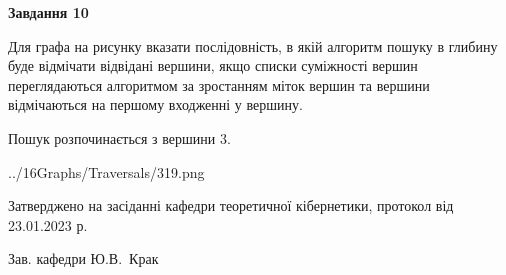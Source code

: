 \documentclass[12pt, ukrainian]{article}
\begin{document}
{\begin {large}
{\begin {center}\textbf{Завдання 10}\end {center}}\par
Для графа на рисунку вказати послідовність, в якій алгоритм пошуку в глибину буде відмічати відвідані вершини, якщо списки суміжності вершин переглядаються алгоритмом за зростанням міток вершин та вершини відмічаються на першому вход\-женні у вершину.\par
Пошук розпочинається з вершини 3.\par

\begin{center}
	{../16Graphs/Traversals/319.png}
\end{center}\par
\newpage


\end {large}
}
{\smallskip \begin {small} Затверджено на засіданні кафедри теоретичної кібернетики, протокол  від   23.01.2023 р.\par\smallskip\smallskip
{\parbox {6.5 cm}{Зав. кафедри \dotfill Ю.В.~Крак}} \end{small}}
\end{document}
